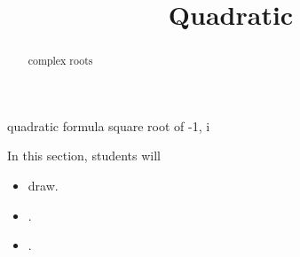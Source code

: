 \documentclass{ximera}
\title{Quadratic}
\begin{document}
\begin{abstract}
complex roots
\end{abstract}
\maketitle



quadratic formula square root of -1, i
























\begin{sectionOutcomes}
In this section, students will 

\begin{itemize}
\item draw.
\item .
\item .
\end{itemize}
\end{sectionOutcomes}
\end{document}
